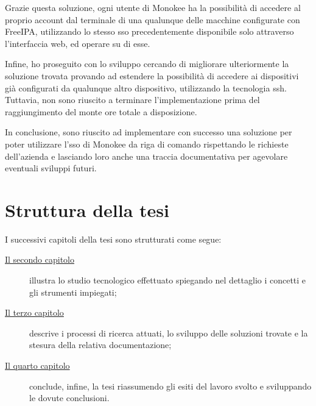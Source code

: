 Grazie questa soluzione, ogni utente di Monokee ha la possibilità di accedere al proprio account dal terminale di una qualunque delle macchine configurate con FreeIPA, utilizzando lo stesso \acrshort{sso} precedentemente disponibile solo attraverso l'interfaccia web, ed operare su di esse.

Infine, ho proseguito con lo sviluppo cercando di migliorare ulteriormente la soluzione trovata provando ad estendere la possibilità di accedere ai dispositivi già configurati da qualunque altro dispositivo, utilizzando la tecnologia \acrfull{ssh}. Tuttavia, non sono riuscito a terminare l'implementazione prima del raggiungimento del monte ore totale a disposizione. 

In conclusione, sono riuscito ad implementare con successo una soluzione per poter utilizzare l'\acrshort{sso} di Monokee da riga di comando rispettando le richieste dell'azienda e lasciando loro anche una traccia documentativa per agevolare eventuali sviluppi futuri.

\section{Struttura della tesi}

I successivi capitoli della tesi sono strutturati come segue:

\begin{description}
    
    \item[{\hyperref[cap:studio-tecnologico]{Il secondo capitolo}}] illustra lo studio tecnologico effettuato spiegando nel dettaglio i concetti e gli strumenti impiegati;


    \item[{\hyperref[cap:ricerca-sperimentazione]{Il terzo capitolo}}] descrive i processi di ricerca attuati, lo sviluppo delle soluzioni trovate e la stesura della relativa documentazione;
    
    \item[{\hyperref[cap:conclusioni]{Il quarto capitolo}}] conclude, infine, la tesi riassumendo gli esiti del lavoro svolto e sviluppando le dovute conclusioni.
\end{description}
